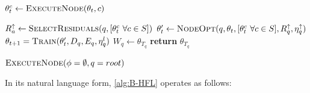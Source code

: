 \begin{algorithm}[H]
\begin{onehalfspace}
\begin{algorithmic}[1]
             \label{alg:B-HFL:line:11}
            \State $\theta_t^c \gets \Call{ExecuteNode}{\theta_t, c} $  \label{alg:B-HFL:line:12}

            \EndFor

             \label{alg:B-HFL:line:13}
            \State $ R^\uparrow_a \gets \Call{SelectResiduals}{q,[\theta^c_t \,\, \forall c \in S]}$ \label{alg:B-HFL:line:14}
            \EndFor
            \State $\theta_t^\prime \gets \Call{NodeOpt}{q,\theta_t, [\theta^c_t \,\, \forall c \in S], R^\uparrow_q, \eta^{\uparrow}_q}  $  \label{alg:B-HFL:line:15}
            \State $\theta_{t+1} = \Call{Train}{\theta_{t}^\prime,D_q,  E_q, \eta^l_q}$  \label{alg:B-HFL:line:7}
            \EndFor
            \State $W_q \gets \theta_{T_q}$  \label{alg:B-HFL:line:16}
            \State \textbf{return} $\theta_{T_q}$ \label{alg:B-HFL:line:17}
            \EndProcedure

            \State $\Call{ExecuteNode}{\phi = \emptyset, q = root}$
        \end{algorithmic}
    \end{onehalfspace}
\end{algorithm}
\noindent In its natural language form, \cref{alg:B-HFL} operates as follows:
